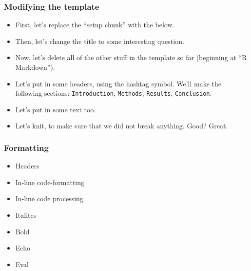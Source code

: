 \documentclass[
]{book}
\providecommand{\tightlist}{%
  \setlength{\itemsep}{0pt}\setlength{\parskip}{0pt}}
\begin{document}
\hypertarget{modifying-the-template}{%
\subsubsection*{Modifying the template}\label{modifying-the-template}}

\begin{itemize}
\item
  First, let's replace the ``setup chunk'' with the below.
\item
  Then, let's change the title to some interesting question.\\
\item
  Now, let's delete all of the other stuff in the template so far (beginning at ``R Markdown'').\\
\item
  Let's put in some headers, using the hashtag symbol. We'll make the following sections: \texttt{Introduction}, \texttt{Methods}, \texttt{Results}, \texttt{Conclusion}.\\
\item
  Let's put in some text too.\\
\item
  Let's knit, to make sure that we did not break anything. Good? Great.
\end{itemize}

\hypertarget{formatting}{%
\subsubsection*{Formatting}\label{formatting}}

\begin{itemize}
\tightlist
\item
  Headers\\
\item
  In-line code-formatting\\
\item
  In-line code processing\\
\item
  Italitcs\\
\item
  Bold\\
\item
  Echo\\
\item
  Eval
\end{itemize}
\end{document}
